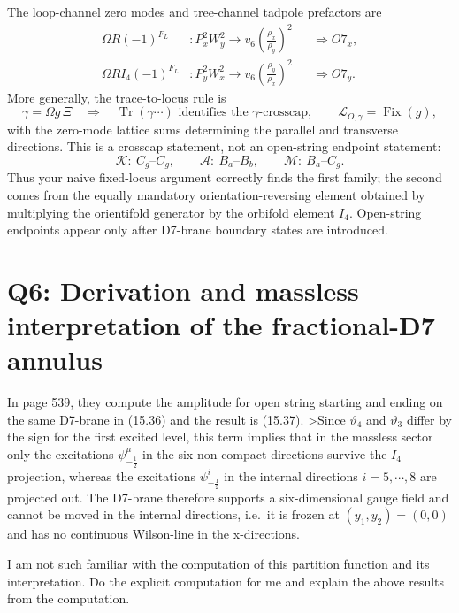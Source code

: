 \documentclass[
  10pt,
  a4paper,
  openany]{book}
\begin{document}
The loop-channel zero modes and tree-channel tadpole prefactors are \[
\boxed{
\begin{aligned}
\Omega R(-1)^{F_L}
&:
P_x^2W_y^2
\longrightarrow
v_6\left(\frac{\rho_x}{\rho_y}\right)^2
&&\Longrightarrow O7_x,\\
\Omega RI_4(-1)^{F_L}
&:
P_y^2W_x^2
\longrightarrow
v_6\left(\frac{\rho_y}{\rho_x}\right)^2
&&\Longrightarrow O7_y.
\end{aligned}
}
\] More generally, the trace-to-locus rule is \[
\boxed{
\gamma=\Omega g\,\Xi
\quad\Longrightarrow\quad
\operatorname{Tr}(\gamma\cdots)
\text{ identifies the }\gamma\text{-crosscap},
\qquad
\mathcal L_{O,\gamma}=\operatorname{Fix}(g),
}
\] with the zero-mode lattice sums determining the parallel and
transverse directions. This is a crosscap statement, not an open-string
endpoint statement: \[
\boxed{
\mathcal K:\ C_g\text{--}C_g,
\qquad
\mathcal A:\ B_a\text{--}B_b,
\qquad
\mathcal M:\ B_a\text{--}C_g.
}
\] Thus your naive fixed-locus argument correctly finds the first
family; the second comes from the equally mandatory
orientation-reversing element obtained by multiplying the orientifold
generator by the orbifold element \(I_4\). Open-string endpoints appear
only after D7-brane boundary states are introduced.

\section{Q6: Derivation and massless interpretation of the fractional-D7
annulus}\label{q6-derivation-and-massless-interpretation-of-the-fractional-d7-annulus}

In page 539, they compute the amplitude for open string starting and
ending on the same D7-brane in (15.36) and the result is (15.37).
\textgreater Since \(\vartheta_{4}\) and \(\vartheta_{3}\) differ by the
sign for the first excited level, this term implies that in the massless
sector only the excitations \(\psi_{-\frac{1}{2}}^\mu\) in the six
non-compact directions survive the \(I_{4}\) projection, whereas the
excitations \(\psi_{-\frac{1}{2}}^i\) in the internal directions
\(i=5,\cdots,8\) are projected out. The D7-brane therefore supports a
six-dimensional gauge field and cannot be moved in the internal
directions, i.e.~it is frozen at \((y_{1},y_{2})=(0,0)\) and has no
continuous Wilson-line in the x-directions.

I am not such familiar with the computation of this partition function
and its interpretation. Do the explicit computation for me and explain
the above results from the computation.
\end{document}
